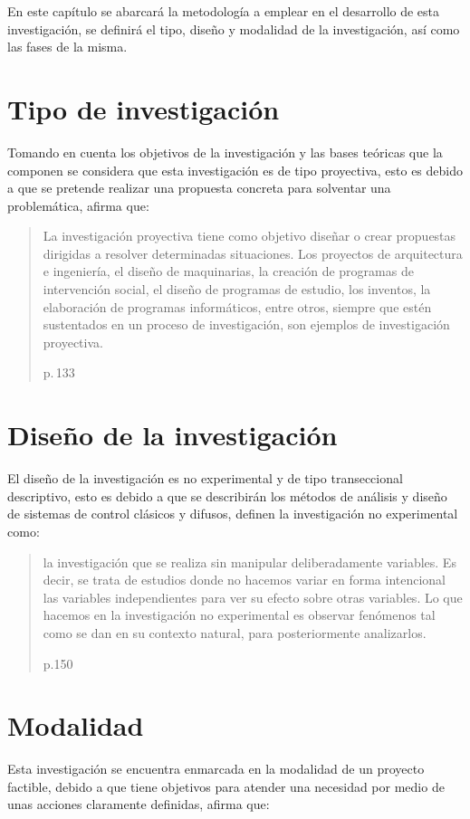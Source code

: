 En este capítulo se abarcará la metodología a emplear en el desarrollo de esta investigación, se definirá el tipo, diseño y modalidad de la investigación, así como las fases de la misma.

\section{Tipo de investigación}
	
	Tomando en cuenta los objetivos de la investigación y las bases teóricas que la componen se considera que esta investigación es de tipo proyectiva, esto es debido a que se pretende realizar una propuesta concreta para solventar una problemática, \textcite{jacquelin2010guia} afirma que:	
	
	\blockquote[p.$\,$133]{La investigación proyectiva tiene como objetivo diseñar o crear propuestas dirigidas a resolver determinadas situaciones. Los proyectos de arquitectura e ingeniería, el diseño de maquinarias, la creación de programas de intervención social, el diseño de programas de estudio, los inventos, la elaboración de programas informáticos, entre otros, siempre que estén sustentados en un proceso de investigación, son ejemplos de investigación proyectiva.}

\section{Diseño de la investigación}

	El diseño de la investigación es no experimental y de tipo transeccional descriptivo, esto es debido a que se describirán los métodos de análisis y diseño de sistemas de control clásicos y difusos, \textcite{sampieri1998metodologia} definen la investigación no experimental como: \blockquote[p.150]{la investigación que se realiza sin manipular deliberadamente variables. Es decir,
	se trata de estudios donde no hacemos variar en forma intencional las variables independientes para
	ver su efecto sobre otras variables. Lo que hacemos en la investigación no experimental
	es observar fenómenos tal como se dan en su contexto natural, para posteriormente
	analizarlos.}

\section{Modalidad}

	Esta investigación se encuentra enmarcada en la modalidad de un proyecto factible, debido a que tiene objetivos para atender una necesidad por medio de unas acciones claramente definidas, \textcite{renie2002factible} afirma que:
	
